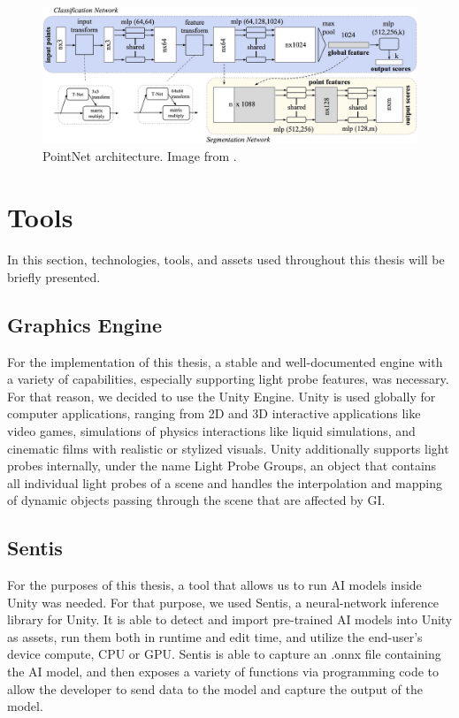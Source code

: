 \begin{figure}[h]
	\centering
	\includegraphics[scale=0.16]{Graphics/pointnet.jpg}
	\caption{PointNet architecture. Image from \cite{PointNet2017}.}
	\label{fig:pointnet}
\end{figure}

\section{Tools} %
In this section, technologies, tools, and assets used throughout this thesis will be briefly presented.

\subsection{Graphics Engine}
For the implementation of this thesis, a stable and well-documented engine with a variety of capabilities, especially supporting light probe features, was necessary. For that reason, we decided to use the Unity Engine. Unity is used globally for computer applications, ranging from 2D and 3D interactive applications like video games, simulations of physics interactions like liquid simulations, and cinematic films with realistic or stylized visuals. Unity additionally supports light probes internally, under the name Light Probe Groups, an object that contains all individual light probes of a scene and handles the interpolation and mapping of dynamic objects passing through the scene that are affected by GI.

\subsection{Sentis}
For the purposes of this thesis, a tool that allows us to run AI models inside Unity was needed. For that purpose, we used Sentis, a neural-network inference library for Unity. It is able to detect and import pre-trained AI models into Unity as assets, run them both in runtime and edit time, and utilize the end-user's device compute, CPU or GPU. Sentis is able to capture an .onnx file containing the AI model, and then exposes a variety of functions via programming code to allow the developer to send data to the model and capture the output of the model.

